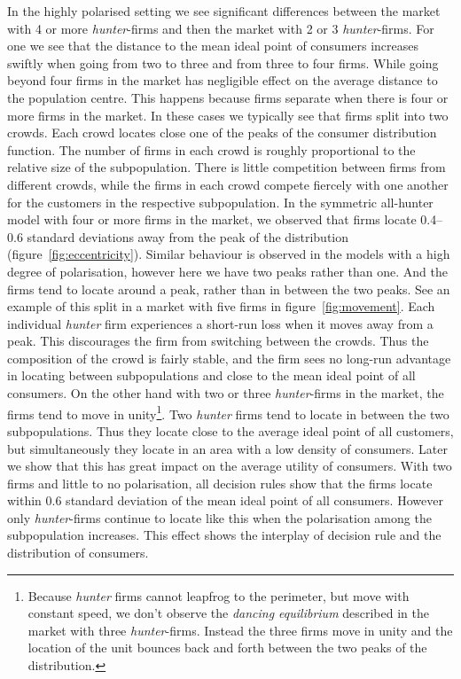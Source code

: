 \documentclass[preprint, 12pt]{elsarticle}
\begin{document}
In the highly polarised setting we see significant differences between the market with 4 or more \emph{hunter}-firms and then the market with 2 or 3 \emph{hunter}-firms. For one we see that the distance to the mean ideal point of consumers increases swiftly when going from two to three and from three to four firms. While going beyond four firms in the market has negligible effect on the average distance to the population centre. This happens because firms separate when there is four or more firms in the market. In these cases we typically see that firms split into two crowds. Each crowd locates close one of the peaks of the consumer distribution function. The number of firms in each crowd is roughly proportional to the relative size of the subpopulation. There is little competition between firms from different crowds, while the firms in each crowd compete fiercely with one another for the customers in the respective subpopulation. In the symmetric all-hunter model with four or more firms in the market, we observed that firms locate 0.4–0.6 standard deviations away from the peak of the distribution (figure~\ref{fig:eccentricity}). Similar behaviour is observed in the models with a high degree of polarisation, however here we have two peaks rather than one. And the firms tend to locate around a peak, rather than in between the two peaks. See an example of this split in a market with five firms in figure~\ref{fig:movement}. Each individual \emph{hunter} firm experiences a short-run loss when it moves away from a peak. This discourages the firm from switching between the crowds. Thus the composition of the crowd is fairly stable, and the firm sees no long-run advantage in locating between subpopulations and close to the mean ideal point of all consumers. On the other hand with two or three \emph{hunter}-firms in the market, the firms tend to move in unity\footnote{Because \emph{hunter} firms cannot leapfrog to the perimeter, but move with constant speed, we don't observe the \emph{dancing equilibrium} described \citet{Eaton_Lipsey_1975} in the market with three \emph{hunter}-firms. Instead the three firms move in unity and the location of the unit bounces back and forth between the two peaks of the distribution.}. Two \emph{hunter} firms tend to locate in between the two subpopulations. Thus they locate close to the average ideal point of all customers, but simultaneously they locate in an area with a low density of consumers. Later we show that this has great impact on the average utility of consumers. With two firms and little to no polarisation, all decision rules show that the firms locate within 0.6 standard deviation of the mean ideal point of all consumers. However only \emph{hunter}-firms continue to locate like this when the polarisation among the subpopulation increases. This effect shows the interplay of decision rule and the distribution of consumers.
\end{document}
